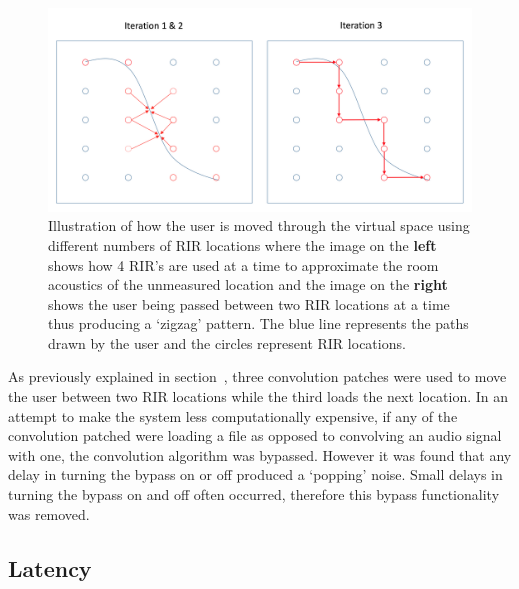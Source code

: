 \documentclass[../../main.tex]{subfiles}
\begin{document}
		\begin{figure}[H]
			\centerline{\includegraphics[scale = 0.4]{Sections/Implementation/Max/images/Max/iterationMovement.png}}
			\caption{Illustration of how the user is moved through the virtual space using different numbers of \ac{RIR} locations where the image on the \textbf{left} shows how 4 \ac{RIR}'s are used at a time to approximate the room acoustics of the unmeasured location and the image on the \textbf{right} shows the user being passed between two \ac{RIR} locations at a time thus producing a `zigzag' pattern. The blue line represents the paths drawn by the user and the circles represent \ac{RIR} locations.}
			\label{iterationMovement}
		\end{figure}



		As previously explained in section~, three convolution patches were used to move the user between two \ac{RIR} locations while the third loads the next location. In an attempt to make the system less computationally expensive, if any of the convolution patched were loading a file as opposed to convolving an audio signal with one, the convolution algorithm was bypassed. However it was found that any delay in turning the bypass on or off produced a `popping' noise. Small delays in turning the bypass on and off often occurred, therefore this bypass functionality was removed.


	\subsection{Latency}
\end{document}
